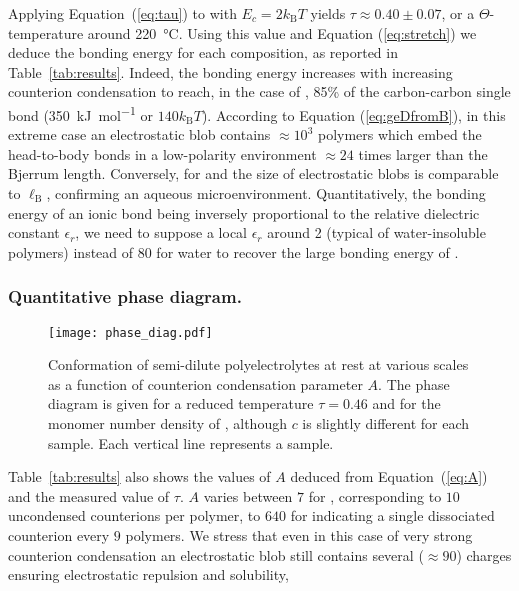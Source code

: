 \documentclass[twoside,twocolumn,9pt]{article}
\begin{document}
Applying Equation~(\ref{eq:tau}) to  with $E_c = 2 k_\mathrm{B}T$ yields $\tau \approx 0.40\pm 0.07$, or a $\Theta$-temperature around \SI{220}{\celsius}. Using this value and Equation (\ref{eq:stretch}) we deduce the bonding energy for each composition, as reported in Table~\ref{tab:results}. Indeed, the bonding energy increases with increasing counterion condensation to reach, in the case of , 85\% of the carbon-carbon single bond (\SI{350}{\kilo\joule\per\mole} or $140 k_\mathrm{B}T$). According to Equation (\ref{eq:geDfromB}), in this extreme case an electrostatic blob contains $\approx 10^3$ polymers which embed the head-to-body bonds in a low-polarity environment $\approx 24$ times larger than the Bjerrum length. Conversely, for  and  the size of electrostatic blobs is comparable to $\ell_\mathrm{B}$, confirming an aqueous microenvironment. Quantitatively, the bonding energy of an ionic bond being inversely proportional to the relative dielectric constant $\epsilon_r$, we need to suppose a local $\epsilon_r$ around 2 (typical of water-insoluble polymers) instead of 80 for water to recover the large bonding energy of .

\subsubsection{Quantitative phase diagram.}

\begin{figure}
\texttt{[image: phase\_diag.pdf]}
\caption{Conformation of semi-dilute polyelectrolytes at rest at various scales as a function of counterion condensation parameter $A$. The phase diagram is given for a reduced temperature $\tau=0.46$ and for the monomer number density of , although $c$ is slightly different for each sample. Each vertical line represents a sample.}
\label{fig:phasediag}
\end{figure}

Table~\ref{tab:results} also shows the values of $A$ deduced from Equation~(\ref{eq:A}) and the measured value of $\tau$. $A$ varies between $7$ for , corresponding to $10$ uncondensed counterions per polymer, to $640$ for  indicating a single dissociated counterion every $9$ polymers. We stress that even in this case of very strong counterion condensation an electrostatic blob still contains several ($\approx 90$) charges ensuring electrostatic repulsion and solubility,
\end{document}
